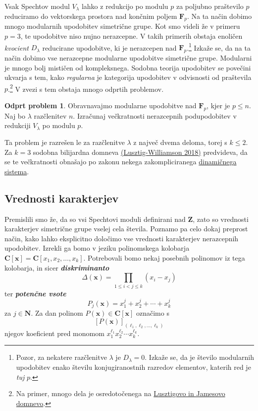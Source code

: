 \documentclass[11pt]{book}
\def\NN{\mathbf{N}}
\def\ZZ{\mathbf{Z}}
\def\CC{\mathbf{C}}
\def\FF{\mathbf{F}}
\def\definicija{\color{rdeca}\bf\em}
\theoremstyle{definition}
\theoremstyle{zgled}
\theoremstyle{odprtproblem}
\newtheorem*{odprtproblem}{Odprt problem}
\theoremstyle{domacanaloga}
\theoremstyle{izrek}
\begin{document}
Vsak Spechtov modul $V_{\lambda}$ lahko z redukcijo po modulu $p$ za poljubno praštevilo $p$ reduciramo do vektorskega prostora nad končnim poljem $\FF_p$. Na ta način dobimo mnogo modularnih upodobitev simetrične grupe. Kot smo videli že v primeru $p = 3$, te upodobitve niso nujno nerazcepne. V takih primerih obstaja enoličen \emph{kvocient} $D_{\lambda}$ reducirane upodobitve, ki je nerazcepen nad $\FF_p$.\footnote{Pozor, za nekatere razčlenitve $\lambda$ je $D_{\lambda} = 0$. Izkaže se, da je število modularnih upodobitev enako številu konjugiranostnih razredov elementov, katerih red je \emph{tuj} $p$.} Izkaže se, da na ta način dobimo vse nerazcepne modularne upodobitve simetrične grupe. Modularni je mnogo bolj mističen od kompleksnega. Sodobna teorija upodobitev se povečini ukvarja s tem, kako \emph{regularna} je kategorija upodobitev v odvisnosti od praštevila $p$.\footnote{Na primer, mnogo dela je osredotočenega na \href{https://mathoverflow.net/questions/138310/what-to-do-now-that-lusztigs-and-james-conjectures-have-been-shown-to-be-false}{Lusztigovo in Jamesovo domnevo}.} V zvezi s tem obstaja mnogo odprtih problemov.

\begin{odprtproblem}
Obravnavajmo modularne upodobitve nad $\FF_p$, kjer je $p \leq n$. Naj bo $\lambda$ razčlenitev $n$. Izračunaj večkratnosti nerazcepnih podupodobitev v redukciji $V_{\lambda}$ po modulu $p$.
\end{odprtproblem}

Ta problem je razrešen le za razčlenitve $\lambda$ z največ dvema deloma, torej s $k \leq 2$. Za $k = 3$ sodobna bilijardna domneva \href{https://arxiv.org/pdf/1703.05898.pdf}{(Lusztig-Williamson 2018)} predvideva, da se te večkratnosti obnašajo po zakonu nekega zakompliciranega \href{https://www.youtube.com/watch?v=Ru0Zys1Vvq4}{dinamičnega sistema}.

\subsection{Vrednosti karakterjev}

Premislili smo že, da so vsi Spechtovi moduli definirani nad $\ZZ$, zato so vrednosti karakterjev simetrične grupe vselej cela števila. Poznamo pa celo dokaj preprost način, kako lahko eksplicitno določimo vse vrednosti karakterjev nerazcepnih upodobitev. Izrekli ga bomo v jeziku polinomskega kolobarja $\CC[\mathbf{x}] = \CC[x_1, x_2, \dots, x_k]$. Potrebovali bomo nekaj posebnih polinomov iz tega kolobarja, in sicer {\definicija diskriminanto}
\[
    \Delta(\mathbf{x}) = \prod_{1 \leq i < j \leq k} (x_i - x_j)
\]
ter {\definicija potenčne vsote}
\[
    P_j(\mathbf{x}) = x_1^j + x_2^j + \cdots + x_k^j
\]
za $j \in \NN$. Za dan polinom $P(\mathbf{x}) \in \CC[\mathbf{x}]$ označimo s
\[
    [P(\mathbf{x})]_{(\ell_1, \ell_2, \dots, \ell_k)}
\]
njegov koeficient pred monomom $x_1^{\ell_1} x_2^{\ell_2} \cdots x_k^{\ell_k}$.
\end{document}
